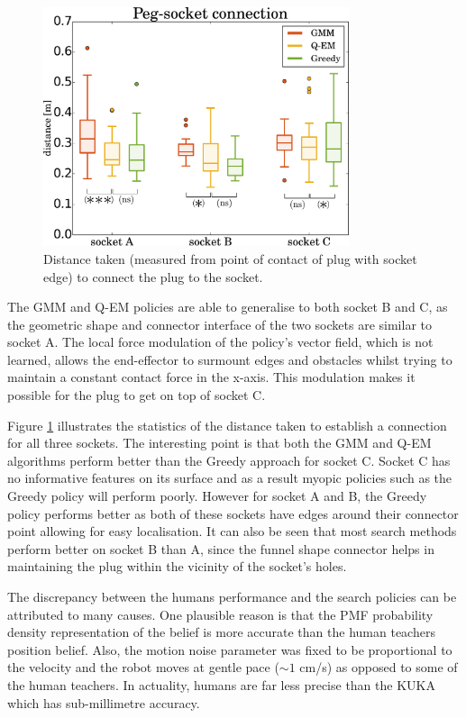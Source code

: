 \begin{figure}
 \centering
   \includegraphics[width=0.8\textwidth]{./ch4-PiH/Figures/Results2/peg_socket_connection_v2.pdf}
   \caption{Distance taken (measured from point of contact of plug with socket edge) to connect the plug to the socket.}
  \label{fig:real_statistics2}
\end{figure}

The GMM and Q-EM policies are able to generalise to both socket B and C, as the geometric shape and connector interface of the 
two sockets are similar to socket A. The local force modulation of the policy's vector field, which is not learned, allows the 
end-effector to surmount edges and obstacles whilst trying to maintain a constant contact force in the x-axis. This modulation makes it possible for the plug to get on top of socket C.

Figure \ref{fig:real_statistics2} illustrates the statistics of the distance taken to establish a connection for all three sockets. 
The interesting point is that both the GMM and Q-EM algorithms perform better than the Greedy approach for socket C. Socket C has no informative 
features on its surface and as a result myopic policies such as the Greedy policy will perform poorly. However for socket A 
and B, the Greedy policy performs better as both of these sockets have edges around their connector point allowing for easy localisation. 
It can also be seen that most search methods perform better on socket B than A, since the funnel shape connector helps in maintaining the plug 
within the vicinity of the socket's holes. 


The discrepancy between the humans performance and the search policies can be attributed to many causes. One plausible reason is 
that the PMF probability density representation of the belief is more accurate than the human teachers position belief. 
Also, the motion noise parameter was fixed to be proportional to the velocity and the robot moves at gentle pace ($\sim1$ cm/s) as 
opposed to some of the human teachers. In actuality, humans are far less precise than the KUKA which has sub-millimetre accuracy.

